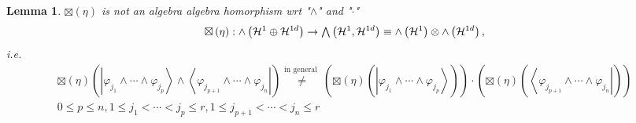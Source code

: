 \documentclass[aps,preprint]{revtex4}%
\newtheorem{lemma}[theorem]{Lemma}
\begin{document}
\begin{lemma}
$\boxtimes\left(  \eta\right)  $ is {\Large not }an algebra algebra homorphism
wrt "$\wedge$" and "$\cdot$"%
\begin{equation}
\boxtimes\left(  \eta\right)  :{\huge \wedge}\left(  \mathcal{H}^{1}%
\oplus\mathcal{H}^{1d}\right)  \rightarrow%
{\textstyle\bigwedge}
\left(  \mathcal{H}^{1},\mathcal{H}^{1d}\right)  \equiv{\huge \wedge}\left(
\mathcal{H}^{1}\right)  \otimes{\huge \wedge}\left(  \mathcal{H}^{1d}\right)
,
\end{equation}
i.e.
\begin{gather}
\boxtimes\left(  \eta\right)  \left(  \overset{}{\left\vert \varphi_{j_{1}%
}\wedge\cdots\wedge\varphi_{j_{p}}\right\rangle \wedge\left\langle
\varphi_{j_{p+1}}\wedge\cdots\wedge\varphi_{j_{n}}\right\vert }\right)
\overset{\text{in general }}{\neq}\left(  \boxtimes\left(  \eta\right)
\left(  \overset{}{\left\vert \varphi_{j_{1}}\wedge\cdots\wedge\varphi_{j_{p}%
}\right\rangle }\right)  \right)  \cdot\left(  \boxtimes\left(  \eta\right)
\left(  \overset{}{\left\langle \varphi_{j_{p+1}}\wedge\cdots\wedge
\varphi_{j_{n}}\right\vert }\right)  \right) \\
0\leq p\leq n,1\leq j_{1}<\cdots<j_{p}\leq r,1\leq j_{p+1}<\cdots<j_{n}\leq r
\end{gather}

\end{lemma}
\end{document}

